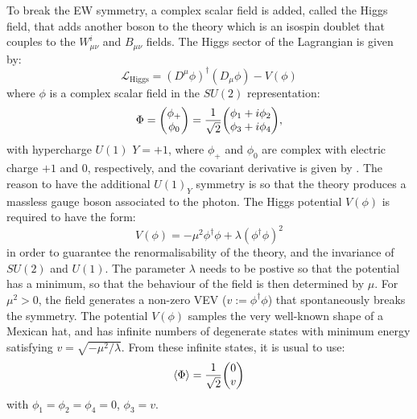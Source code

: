 To break the \ac{EW} symmetry, a complex scalar field is added, called the Higgs field, that adds another boson to the theory which is an isospin doublet that couples to the \(W_{\mu\nu}^i\) and \(B_{\mu\nu}\) fields. The Higgs sector of the Lagrangian is given by:
\begin{equation}
    \mathcal{L}_{\text{Higgs}} = \left(D^{\mu} \phi\right)^{\dagger} \left(D_{\mu} \phi\right) - V(\phi)
\end{equation}
where \(\phi\) is a complex scalar field in the \(SU(2)\) representation:
\begin{equation}
    \Phi = \mqty( \phi_{+} \\ \phi_0 ) = \frac{1}{\sqrt{2}} \mqty(\phi_1 + i \phi_2 \\ \phi_3 + i \phi_4),
\end{equation}
with hypercharge \(U(1)\) \(Y=+1\), where \(\phi_{+}\) and \(\phi_{0}\) are complex with electric charge \(+1\) and \(0\), respectively, and the covariant derivative is given by \Eqn{\ref{eq:theory:sm:mathematical:ew:covariant_derivative}}. The reason to have the additional \(U(1)_Y\) symmetry is so that the theory produces a massless gauge boson associated to the photon. The Higgs potential \(V(\phi)\) is required to have the form:
\begin{equation}
    V(\phi) = -\mu^2 \phi^{\dagger} \phi + \lambda \left(\phi^{\dagger} \phi\right)^2
\end{equation}
in order to guarantee the renormalisability of the theory, and the invariance of \(SU(2)\) and \(U(1)\). The parameter \(\lambda\) needs to be postive so that the potential has a minimum, so that the behaviour of the field is then determined by \(\mu\). For \(\mu^2 > 0\), the field generates a non-zero \ac{VEV} (\(v := \phi^{\dagger} \phi\)) that spontaneously breaks the symmetry. The potential \(V(\phi)\) samples the very well-known shape of a Mexican hat, and has infinite numbers of degenerate states with minimum energy satisfying \(v = \sqrt{-\mu^2/\lambda}\). From these infinite states, it is usual to use:
\begin{equation}
    \expval{\Phi} = \frac{1}{\sqrt{2}} \mqty(0\\v)
\end{equation}
with \(\phi_1 = \phi_2 = \phi_4 = 0\), \(\phi_3 = v\).

